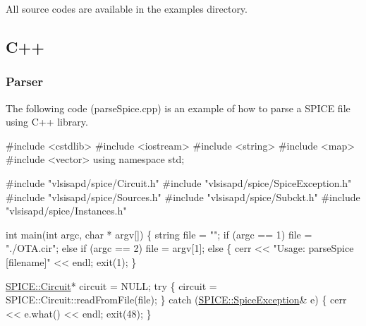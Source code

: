 All source codes are available in the {\ttfamily examples} directory.\hypertarget{spice_spiceC}{}\subsection{C++}\label{spice_spiceC}
\hypertarget{spice_spiceParseC}{}\subsubsection{Parser}\label{spice_spiceParseC}
The following code ({\ttfamily parse\-Spice.\-cpp}) is an example of how to parse a S\-P\-I\-C\-E file using C++ library. 
\begin{DoxyCodeInclude}
\textcolor{preprocessor}{#include <cstdlib>}
\textcolor{preprocessor}{#include <iostream>}
\textcolor{preprocessor}{#include <string>}
\textcolor{preprocessor}{#include <map>}
\textcolor{preprocessor}{#include <vector>}
\textcolor{keyword}{using namespace }std;

\textcolor{preprocessor}{#include "vlsisapd/spice/Circuit.h"}
\textcolor{preprocessor}{#include "vlsisapd/spice/SpiceException.h"}
\textcolor{preprocessor}{#include "vlsisapd/spice/Sources.h"}
\textcolor{preprocessor}{#include "vlsisapd/spice/Subckt.h"}
\textcolor{preprocessor}{#include "vlsisapd/spice/Instances.h"}

\textcolor{keywordtype}{int} main(\textcolor{keywordtype}{int} argc, \textcolor{keywordtype}{char} * argv[]) \{
    \textcolor{keywordtype}{string} file = \textcolor{stringliteral}{""};
    \textcolor{keywordflow}{if} (argc == 1)
        file = \textcolor{stringliteral}{"./OTA.cir"};
    \textcolor{keywordflow}{else} \textcolor{keywordflow}{if} (argc == 2)
        file = argv[1];
    \textcolor{keywordflow}{else} \{
        cerr << \textcolor{stringliteral}{"Usage: parseSpice [filename]"} << endl;
        exit(1);
    \}

    \hyperlink{class_s_p_i_c_e_1_1_circuit}{SPICE::Circuit}* circuit = NULL;
    \textcolor{keywordflow}{try} \{
        circuit = SPICE::Circuit::readFromFile(file);
    \} \textcolor{keywordflow}{catch} (\hyperlink{class_s_p_i_c_e_1_1_spice_exception}{SPICE::SpiceException}& e) \{
        cerr << e.what() << endl;
        exit(48);
    \}


\end{DoxyCodeInclude}
